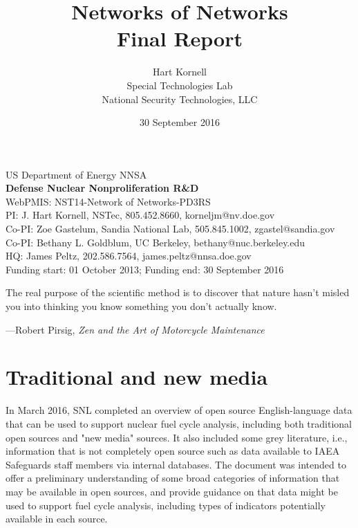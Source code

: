 \documentclass{article} %
\title{Networks of Networks\\Final Report}
\author{Hart Kornell\\ Special Technologies Lab\\National Security Technologies, LLC}
\date{30 September 2016}
\begin{document}
\maketitle

\vfill
\begin{center}
US Department of Energy NNSA \\
\textbf{Defense Nuclear Nonproliferation R\&D} \\
WebPMIS: NST14-Network of Networks-PD3RS  \\
PI: J. Hart Kornell, NSTec, 805.452.8660, korneljm@nv.doe.gov \\
Co-PI: Zoe Gastelum, Sandia National Lab, 505.845.1002, zgastel@sandia.gov \\
Co-PI: Bethany L. Goldblum, UC Berkeley, bethany@nuc.berkeley.edu \\
HQ: James Peltz, 202.586.7564, james.peltz@nnsa.doe.gov \\
Funding start: 01 October 2013; Funding end: 30 September 2016
\end{center}
\pagebreak

\quote
The real purpose of the scientific method is to discover that nature hasn't misled you into thinking you know something you don't actually know. 

---Robert Pirsig, \textit{Zen and the Art of Motorcycle Maintenance}
\endquote

\pagebreak
\section*{Traditional and new media}
In March 2016, SNL completed an overview of open source English-language data that can be used to support nuclear fuel cycle analysis, including both traditional open sources and "new media" sources. It also included some grey literature, i.e., information that is not completely open source such as data available to IAEA Safeguards staff members via internal databases. The document was intended to offer a preliminary understanding of some broad categories of information that may be available in open sources, and provide guidance on that data might be used to support fuel cycle analysis, including types of indicators potentially available in each source.
\end{document}
